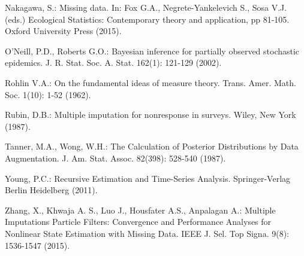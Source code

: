 \begin{thebibliography}{}
Nakagawa, S.: Missing data. In: Fox G.A., Negrete-Yankelevich S., Sosa V.J. (eds.) Ecological Statistics: Contemporary theory and application, pp 81-105. Oxford University Press (2015). 

O'Neill, P.D., Roberts G.O.: Bayesian inference for partially observed stochastic epidemics. J. R. Stat. Soc. A. Stat. 162(1): 121-129 (2002).

Rohlin V.A.: On the fundamental ideas of measure theory.  Trans.
Amer. Math. Soc. 1(10): 1-52 (1962).

Rubin, D.B.: Multiple imputation for nonresponse in surveys. Wiley, New York (1987).

Tanner, M.A., Wong, W.H.: The Calculation of Posterior Distributions by Data Augmentation. J. Am. Stat. Assoc. 82(398): 528-540 (1987).

Young, P.C.: Recursive Estimation and Time-Series Analysis. Springer-Verlag Berlin Heidelberg (2011).

Zhang, X., Khwaja A. S., Luo J., Housfater A.S., Anpalagan A.: Multiple Imputations Particle Filters: Convergence and Performance Analyses for Nonlinear State Estimation with Missing Data. IEEE J. Sel. Top Signa. 9(8): 1536-1547 (2015).

\end{thebibliography}


\clearpage
\appendix

